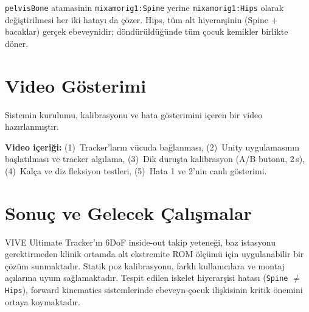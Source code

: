 \documentclass[11pt,a4paper]{article}
\begin{document}
\texttt{pelvisBone} atamasinin \texttt{mixamorig1:Spine} yerine
\textcolor{solgreen}{\texttt{mixamorig1:Hips}} olarak de\u{g}i\c{s}tirilmesi
her iki hatay{\i} da \c{c}\"ozer. Hips, t\"um alt hiyerar\c{s}inin (Spine +
bacaklar) ger\c{c}ek ebeveynidir; d\"ond\"ur\"uld\"u\u{g}\"unde t\"um \c{c}ocuk kemikler
birlikte d\"oner.

\section{Video G\"osterimi}
\label{sec:video}

Sistemin kurulumu, kalibrasyonu ve hata g\"osterimini i\c{c}eren bir video
haz{\i}rlanm{\i}\c{s}t{\i}r.

\textbf{Video i\c{c}eri\u{g}i:} (1)~Tracker'lar{\i}n v\"ucuda ba\u{g}lanmas{\i},
(2)~Unity uygulamas{\i}n{\i}n ba\c{s}lat{\i}lmas{\i} ve tracker alg{\i}lama,
(3)~Dik duru\c{s}ta kalibrasyon (A/B butonu, 2\,s),
(4)~Kal\c{c}a ve diz fleksiyon testleri,
(5)~Hata 1 ve 2'nin canl{\i} g\"osterimi.

\section{Sonu\c{c} ve Gelecek \c{C}al{\i}\c{s}malar}
\label{sec:sonuc}

VIVE Ultimate Tracker'{\i}n 6DoF inside-out takip yetene\u{g}i, baz
istasyonu gerektirmeden klinik ortamda alt ekstremite ROM \"ol\c{c}\"um\"u
i\c{c}in uygulanabilir bir \c{c}\"oz\"um sunmaktad{\i}r. Statik poz
kalibrasyonu, farkl{\i} kullan{\i}c{\i}lara ve montaj a\c{c}{\i}lar{\i}na uyum
sa\u{g}lamaktad{\i}r. Tespit edilen iskelet hiyerar\c{s}isi hatas{\i}
(\texttt{Spine} $\neq$ \texttt{Hips}), forward kinematics
sistemlerinde ebeveyn-\c{c}ocuk ili\c{s}kisinin kritik \"onemini ortaya
koymaktad{\i}r.
\end{document}
